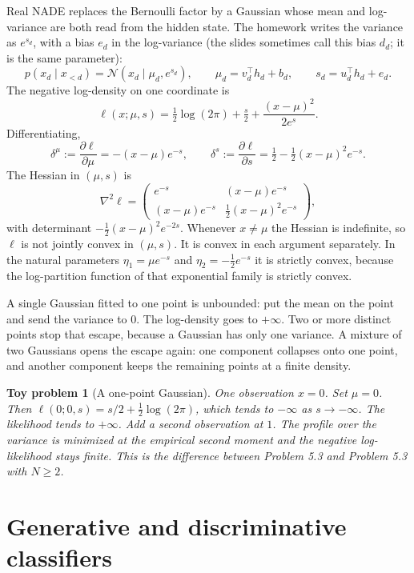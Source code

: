 \documentclass[11pt]{article}
\newtheorem{toy}{Toy problem}
\theoremstyle{remark}
\newcommand{\N}{\mathcal{N}}
\begin{document}
Real NADE replaces the Bernoulli factor by a Gaussian whose mean and log-variance are both read from the hidden state. The homework writes the variance as \(e^{s_d}\), with a bias \(e_d\) in the log-variance (the slides sometimes call this bias \(d_d\); it is the same parameter):
\[
p(x_d\mid x_{<d})=\N(x_d\mid\mu_d,e^{s_d}),\qquad
\mu_d=v_d^\top h_d+b_d,\qquad
s_d=u_d^\top h_d+e_d.
\]
The negative log-density on one coordinate is
\[
\ell(x;\mu,s)=\tfrac12\log(2\pi)+\tfrac s2+\frac{(x-\mu)^2}{2e^{s}}.
\]
Differentiating,
\[
\delta^\mu:=\frac{\partial\ell}{\partial\mu}=-(x-\mu)e^{-s},\qquad
\delta^s:=\frac{\partial\ell}{\partial s}=\tfrac12-\tfrac12(x-\mu)^2 e^{-s}.
\]
The Hessian in \((\mu,s)\) is
\[
\nabla^2\ell
=\begin{pmatrix}
e^{-s} & (x-\mu)e^{-s}\\
(x-\mu)e^{-s} & \tfrac12(x-\mu)^2 e^{-s}
\end{pmatrix},
\]
with determinant \(-\tfrac12(x-\mu)^2 e^{-2s}\). Whenever \(x\ne\mu\) the Hessian is indefinite, so \(\ell\) is not jointly convex in \((\mu,s)\). It is convex in each argument separately. In the natural parameters \(\eta_1=\mu e^{-s}\) and \(\eta_2=-\tfrac12 e^{-s}\) it is strictly convex, because the log-partition function of that exponential family is strictly convex.

A single Gaussian fitted to one point is unbounded: put the mean on the point and send the variance to \(0\). The log-density goes to \(+\infty\). Two or more distinct points stop that escape, because a Gaussian has only one variance. A mixture of two Gaussians opens the escape again: one component collapses onto one point, and another component keeps the remaining points at a finite density.

\begin{toy}[A one-point Gaussian]
One observation \(x=0\). Set \(\mu=0\). Then \(\ell(0;0,s)=s/2+\tfrac12\log(2\pi)\), which tends to \(-\infty\) as \(s\to-\infty\). The likelihood tends to \(+\infty\). Add a second observation at \(1\). The profile over the variance is minimized at the empirical second moment and the negative log-likelihood stays finite. This is the difference between Problem 5.3 and Problem 5.3 with \(N\ge 2\).
\end{toy}

\section{Generative and discriminative classifiers}
\label{sec:disc}
\end{document}
